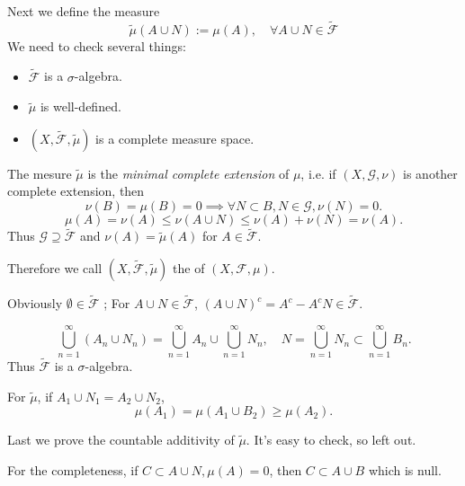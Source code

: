 Next we define the measure
\[
	\widetilde{\mu}(A\cup N) := \mu(A),\quad \forall A\cup N\in \widetilde{\mathscr{F}}
\]
We need to check several things:
\begin{itemize}
	\item $\widetilde{\mathscr{F}}$ is a $\sigma$-algebra.
	\item $\widetilde{\mu}$ is well-defined.
	\item $(X, \widetilde{\mathscr{F}}, \widetilde{\mu})$ is a complete
		measure space.
\end{itemize}
\begin{remark}
    The mesure $\widetilde{\mu}$ is the \textit{minimal complete extension}
	of $\mu$, i.e. if $(X,\mathscr{G},\nu)$ is another complete extension,
	then
	\[
	\nu(B)=\mu(B)=0 \implies \forall N \subset B, N\in \mathscr{G}, \nu(N) = 0.
	\]
	\[
	\mu(A)=\nu(A)\le \nu(A\cup N)\le \nu(A) + \nu(N) = \nu(A).
	\]
	Thus $\mathscr{G}\supseteq \widetilde{\mathscr{F}}$ and $\nu(A)=\widetilde{\mu}(A)$
	for $A\in \widetilde{\mathscr{F}}$.

	Therefore we call $(X,\widetilde{\mathscr{F}},\widetilde{\mu})$ the
	 of $(X,\mathscr{F},\mu)$.
\end{remark}

Obviously $\emptyset\in \widetilde{\mathscr{F}}$ ;
For $A\cup N\in \widetilde{\mathscr{F}}$,
$(A\cup N)^c = A^c - A^cN\in \widetilde{\mathscr{F}}$.

\[
\bigcup_{n=1}^\infty (A_n\cup N_n)=\bigcup_{n=1}^\infty A_n \cup \bigcup_{n=1}^\infty N_n,
\quad N = \bigcup_{n=1}^\infty N_n \subset \bigcup_{n=1}^\infty B_n.
\]
Thus $\widetilde{\mathscr{F}}$ is a $\sigma$-algebra.

For  $\widetilde{\mu}$, if $A_1\cup N_1=A_2\cup N_2$,
\[
\mu(A_1)=\mu(A_1\cup B_2)\ge \mu(A_2).
\]

Last we prove the countable additivity of $\widetilde{\mu}$.
It's easy to check, so left out.

For the completeness, if $C \subset A\cup N, \mu(A)=0$,
then $C \subset A\cup B$ which is null.

